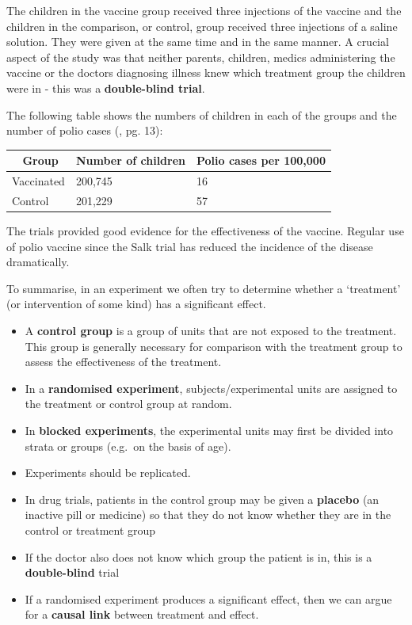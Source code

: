 \documentclass[
  oneside]{krantz}
\begin{document}
The children in the vaccine group received three injections of the vaccine and the children in the comparison, or control, group received three injections of a saline solution. They were given at the same time and in the same manner.
A crucial aspect of the study was that neither parents, children, medics administering the vaccine or the doctors diagnosing illness knew which treatment group the children were in - this was a \textbf{double-blind trial}.

The following table shows the numbers of children in each of the groups and the number of polio cases (\citep{Snedecor&Cochran1980}, pg. 13):

\begin{longtable}[]{@{}lll@{}}
\toprule
~ Group & Number of children & Polio cases per 100,000\tabularnewline
\midrule
\endhead
Vaccinated & 200,745 & 16\tabularnewline
Control & 201,229 & 57\tabularnewline
\bottomrule
\end{longtable}

The trials provided good evidence for the effectiveness of the vaccine. Regular use of polio vaccine since the Salk trial has reduced the incidence of the disease dramatically.

To summarise, in an experiment we often try to determine whether a `treatment' (or intervention of some kind) has a significant effect.

\begin{itemize}
\item
  A \textbf{control group} is a group of units that are not exposed to the treatment. This group is generally necessary for comparison with the treatment group to assess the effectiveness of the treatment.
\item
  In a \textbf{randomised experiment}, subjects/experimental units are assigned to the treatment or control group at random.
\item
  In \textbf{blocked experiments}, the experimental units may first be divided into strata or groups (e.g.~on the basis of age).
\item
  Experiments should be replicated.
\item
  In drug trials, patients in the control group may be given a \textbf{placebo} (an inactive pill or medicine) so that they do not know whether they are in the control or treatment group
\item
  If the doctor also does not know which group the patient is in, this is a \textbf{double-blind} trial
\item
  If a randomised experiment produces a significant effect, then we can argue for a \textbf{causal link} between treatment and effect.
\end{itemize}
\end{document}
